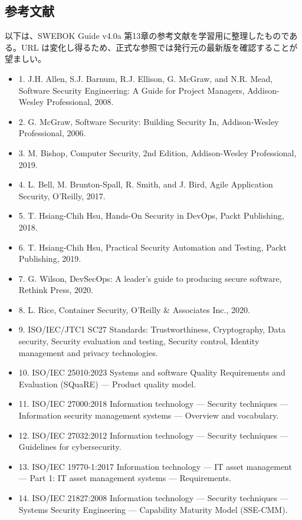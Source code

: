 \subsection{参考文献}
以下は、SWEBOK Guide v4.0a 第13章の参考文献を学習用に整理したものである。URL は変化し得るため、正式な参照では発行元の最新版を確認することが望ましい。

\begin{itemize}[leftmargin=2em]
\item 1. J.H. Allen, S.J. Barnum, R.J. Ellison, G. McGraw, and N.R. Mead, Software Security Engineering: A Guide for Project Managers, Addison-Wesley Professional, 2008.
\item 2. G. McGraw, Software Security: Building Security In, Addison-Wesley Professional, 2006.
\item 3. M. Bishop, Computer Security, 2nd Edition, Addison-Wesley Professional, 2019.
\item 4. L. Bell, M. Brunton-Spall, R. Smith, and J. Bird, Agile Application Security, O’Reilly, 2017.
\item 5. T. Hsiang-Chih Hsu, Hands-On Security in DevOps, Packt Publishing, 2018.
\item 6. T. Hsiang-Chih Hsu, Practical Security Automation and Testing, Packt Publishing, 2019.
\item 7. G. Wilson, DevSecOps: A leader’s guide to producing secure software, Rethink Press, 2020.
\item 8. L. Rice, Container Security, O’Reilly \& Associates Inc., 2020.
\item 9. ISO/IEC/JTC1 SC27 Standards: Trustworthiness, Cryptography, Data security, Security evaluation and testing, Security control, Identity management and privacy technologies.
\item 10. ISO/IEC 25010:2023 Systems and software Quality Requirements and Evaluation (SQuaRE) — Product quality model.
\item 11. ISO/IEC 27000:2018 Information technology — Security techniques — Information security management systems — Overview and vocabulary.
\item 12. ISO/IEC 27032:2012 Information technology — Security techniques — Guidelines for cybersecurity.
\item 13. ISO/IEC 19770-1:2017 Information technology — IT asset management — Part 1: IT asset management systems — Requirements.
\item 14. ISO/IEC 21827:2008 Information technology — Security techniques — Systems Security Engineering — Capability Maturity Model (SSE-CMM).

\end{itemize}
